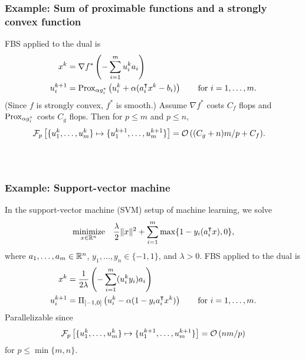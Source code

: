 \documentclass[10pt,mathserif]{beamer}
\begin{document}
\begin{frame}
\frametitle{Example: Sum of proximable functions and a strongly convex function}
FBS applied to the dual is
\begin{align*}
  x^k & = \nabla f^*\left(-\sum_{i=1}^{m} u_i^ka_i\right)\\
  u_i^{k+1} & = \mathrm{Prox}_{\alpha g^*_i}\left(u_i^k + \alpha (a_i^\intercal x^k-b_i)\right)\qquad\text{for }i=1,\dots,m.
\end{align*}
(Since $f$ is strongly convex, $f^*$ is smooth.)
Assume $\nabla f^*$ costs $C_f$ flops and $\mathrm{Prox}_{\alpha g_i^*}$ costs $C_g$ flops.
Then for $p\le m$ and $p\le n$,
\begin{align*}
&\mathcal{F}_p\left[\{u_1^k,\dots,u_m^k\}\mapsto \{u_1^{k+1},\dots,u_m^{k+1}\}\right]
={\mathcal{O}\left((C_g+n)m/p +C_f\right)}.
\end{align*}
\\[5pt]
~\\
\end{frame}


\begin{frame}
\frametitle{Example: Support-vector machine}
In the support-vector machine (SVM) setup of machine learning, we solve
\[
\begin{array}{ll}
\underset{x\in \mathbb{R}^{n}}{\mbox{minimize}}&
\displaystyle{
\frac{\lambda}{2}
\|x\|^2+ \sum_{i=1}^{m}\max\{1-y_i(a_i^\intercal x),0\}},
\end{array}
\]
where $a_1,\dots,a_m\in\mathbb{R}^n$, $y_1,\dots,y_n\in\{-1,1\}$, and $\lambda>0$.
\pause
FBS applied to the dual is
\begin{align*}
  x^k & = \frac{1}{2\lambda}\left(-\sum_{i=1}^{m} (u_i^ky_i)a_i\right)\\
  u_i^{k+1} & =
  \Pi_{[-1,0]}
  \left(
  u_i^k - \alpha (1-y_ia_i^\intercal x^k)
  \right)\qquad\text{for }i=1,\dots,m.
\end{align*}
\pause
Parallelizable since
\begin{align*}
\mathcal{F}_p\left[\{u_1^k,\dots,u_m^k\}\mapsto \{u_1^{k+1},\dots,u_m^{k+1}\}\right]={\mathcal{O}\left(nm/p\right)}
\end{align*}
for $p\le \min\{m,n\}$.
\end{frame}
\end{document}
